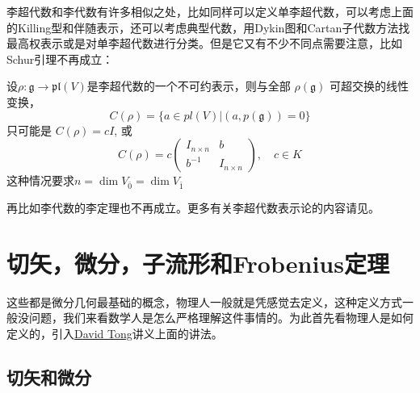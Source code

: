 李超代数和李代数有许多相似之处，比如同样可以定义单李超代数，可以考虑上面的Killing型和伴随表示，还可以考虑典型代数，用Dykin图和Cartan子代数方法找最高权表示或是对单李超代数进行分类。但是它又有不少不同点需要注意，比如Schur引理不再成立：
\begin{theorem}[超Schur引理]
	设$\rho:\mathfrak{g}\longrightarrow\mathfrak{pl}(V)$是李超代数的一个不可约表示，则与全部 $\rho(\mathfrak{g})$ 可超交换的线性变换，
	$$C(\rho)=\{a\in pl(V)|(a,p(\mathfrak{g}))=0\}$$
	只可能是 $C(\rho)=cI$, 或
	\[C(\rho)=c\begin{pmatrix}I_{n\times n}&b\\b^{-1}&I_{n\times n}\end{pmatrix},\quad c\in K\]
	这种情况要求$n=\dim V_{\bar 0}=\dim V_{\bar 1}$
\end{theorem}
再比如李代数的李定理也不再成立。更多有关李超代数表示论的内容请见\cite{superlie,WLXJ198301002,Kac:1977em}。
\section{切矢，微分，子流形和Frobenius定理}
这些都是微分几何最基础的概念，物理人一般就是凭感觉去定义，这种定义方式一般没问题，我们来看数学人是怎么严格理解这件事情的。为此首先看物理人是如何定义的，引入\href{https://www.damtp.cam.ac.uk/user/tong/gr.html}{David Tong}讲义上面的讲法。
\subsection{切矢和微分}

